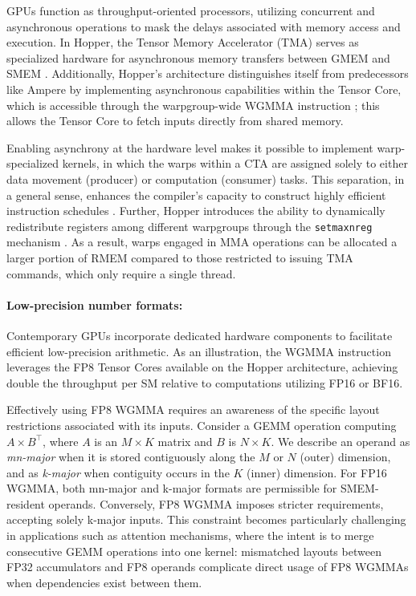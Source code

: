 GPUs function as throughput-oriented processors, utilizing concurrent and asynchronous operations to mask the delays associated with memory access and execution. In Hopper, the Tensor Memory Accelerator (TMA) serves as specialized hardware for asynchronous memory transfers between GMEM and SMEM \cite[\S7.29]{cuda}. Additionally, Hopper’s architecture distinguishes itself from predecessors like Ampere by implementing asynchronous capabilities within the Tensor Core, which is accessible through the warpgroup-wide WGMMA instruction \cite[\S9.7.14]{ptx}; this allows the Tensor Core to fetch inputs directly from shared memory.

Enabling asynchrony at the hardware level makes it possible to implement warp-specialized kernels, in which the warps within a CTA are assigned solely to either data movement (producer) or computation (consumer) tasks. This separation, in a general sense, enhances the compiler's capacity to construct highly efficient instruction schedules \citep{warp-specialization-2011}. Further, Hopper introduces the ability to dynamically redistribute registers among different warpgroups through the \verb|setmaxnreg| mechanism \cite[\S9.7.17.1]{ptx}. As a result, warps engaged in MMA operations can be allocated a larger portion of RMEM compared to those restricted to issuing TMA commands, which only require a single thread.

\paragraph{Low-precision number formats:}
\label{sec:low-precision-gpu}
Contemporary GPUs incorporate dedicated hardware components to facilitate efficient low-precision arithmetic. As an illustration, the WGMMA instruction leverages the FP8 Tensor Cores available on the Hopper architecture, achieving double the throughput per SM relative to computations utilizing FP16 or BF16.

Effectively using FP8 WGMMA requires an awareness of the specific layout restrictions associated with its inputs. Consider a GEMM operation computing $A \times B^{\top}$, where $A$ is an $M\times K$ matrix and $B$ is $N\times K$. We describe an operand as \emph{mn-major} when it is stored contiguously along the $M$ or $N$ (outer) dimension, and as \emph{k-major} when contiguity occurs in the $K$ (inner) dimension. For FP16 WGMMA, both mn-major and k-major formats are permissible for SMEM-resident operands. Conversely, FP8 WGMMA imposes stricter requirements, accepting solely k-major inputs. This constraint becomes particularly challenging in applications such as attention mechanisms, where the intent is to merge consecutive GEMM operations into one kernel: mismatched layouts between FP32 accumulators and FP8 operands complicate direct usage of FP8 WGMMAs when dependencies exist between them.

